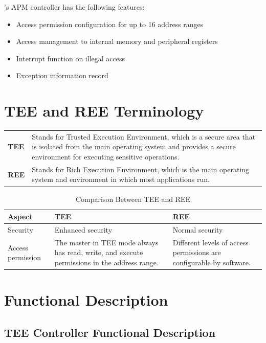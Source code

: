 \documentclass[main\_\_EN.tex]{subfiles}
\begin{document}
\chipname{}'s APM controller has the following features:

\begin{itemize}
    \item Access permission configuration for up to 16 address ranges
    \item Access management to internal memory and peripheral registers
    \item Interrupt function on illegal access
    \item Exception information record
\end{itemize}

\section{TEE and REE Terminology}

\begin{longtable}[L]{ R{2cm} p{13cm} }

\textbf{TEE} & Stands for Trusted Execution Environment, which is a secure area that is isolated from the main operating system and provides a secure environment for executing sensitive operations. \\

\textbf{REE} & Stands for Rich Execution Environment, which is the main operating system and environment in which most applications run.
\end{longtable}

\begin{longtable}{|L{3cm}|L{6cm}|L{6cm}|}
    \caption{Comparison Between TEE and REE}
    \label{tab:tee-ree-comparison}\\
\hline{}
\textbf{Aspect} & \textbf{TEE} & \textbf{REE} \\
\hline
Security & Enhanced security & Normal security \\
\hline
Access permission &  The master in TEE mode always has read, write, and execute permissions in the address range. & Different levels of access permissions are configurable by software.\\
\hline
\end{longtable}

\section{Functional Description}

\subsection{TEE Controller Functional Description}
\end{document}
